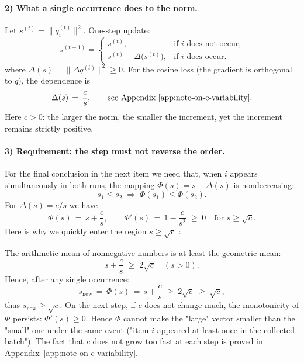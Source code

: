 \paragraph{2) What a single occurrence does to the norm.}
Let $s^{(t)} = \bigl\|q_i^{(t)}\bigr\|^2$. One-step update:
\begin{equation}
s^{(t+1)} = \begin{cases}
s^{(t)}, & \text{if $i$ does not occur,} \\
s^{(t)} + \Delta\bigl(s^{(t)}\bigr), & \text{if $i$ does occur.}
\end{cases}
\end{equation}
where $\Delta(s) = \bigl\|\Delta q^{(t)}\bigr\|^2 \ge 0$. For the cosine loss (the gradient is orthogonal to $q$), the dependence is
\begin{equation}
\Delta(s) \,=\, \frac{c}{s}, \qquad \text{see Appendix~\ref{app:note-on-c-variability}}.
\end{equation}
Here $c > 0$: the larger the norm, the smaller the increment, yet the increment remains strictly positive.

\paragraph{3) Requirement: the step must not reverse the order.}
For the final conclusion in the next item we need that, when $i$ appears simultaneously in both runs, the mapping $\Phi(s) = s + \Delta(s)$ is nondecreasing:
\begin{equation}
s_1 \le s_2 \;\Rightarrow\; \Phi(s_1) \le \Phi(s_2).
\end{equation}
For $\Delta(s) = c/s$ we have
\begin{equation}
\Phi(s) \,=\, s + \frac{c}{s}, \qquad \Phi'(s) \,=\, 1 - \frac{c}{s^2} \;\ge\; 0 \quad \text{for } s \ge \sqrt{c}.
\end{equation}
Here is why we quickly enter the region $s \ge \sqrt{c}$ : 

The arithmetic mean of nonnegative numbers is at least the geometric mean:
\begin{equation}
s + \frac{c}{s} \;\ge\; 2\sqrt{c} \quad (s>0).
\end{equation}
Hence, after any single occurrence:
\begin{equation}
s_{\mathrm{new}} \,=\, \Phi(s) \,=\, s + \frac{c}{s} \;\ge\; 2\sqrt{c} \;\ge\; \sqrt{c} ,
\end{equation}
thus $s_{\mathrm{new}} \ge \sqrt{c}$. On the next step, if $c$ does not change much, the monotonicity of $\Phi$ persists: $\Phi'(s) \ge 0$. Hence $\Phi$ cannot make the "large" vector smaller than the "small" one under the same event ("item $i$ appeared at least once in the collected batch"). The fact that $c$ does not grow too fast at each step is proved in Appendix~\ref{app:note-on-c-variability}.

